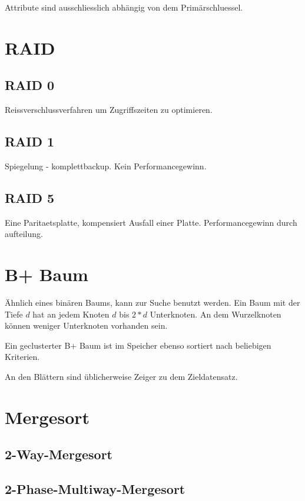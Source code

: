 \documentclass[10pt,a4paper,oneside]{report}
\begin{document}
Attribute sind ausschliesslich abhängig von dem Primärschluessel.

\section*{RAID}

\subsection*{RAID 0}

Reissverschlussverfahren um Zugriffszeiten zu optimieren.

\subsection*{RAID 1}

Spiegelung - komplettbackup. Kein Performancegewinn.

\subsection*{RAID 5}

Eine Paritaetsplatte, kompensiert Ausfall einer Platte. Performancegewinn durch aufteilung.

\section*{B+ Baum}

Ähnlich eines binären Baums, kann zur Suche benutzt werden. Ein Baum mit der Tiefe $d$ hat an jedem Knoten $d$ bis $2*d$ Unterknoten. An dem Wurzelknoten können weniger Unterknoten vorhanden sein.

Ein geclusterter B+ Baum ist im Speicher ebenso sortiert nach beliebigen Kriterien.

An den Blättern sind üblicherweise Zeiger zu dem Zieldatensatz.

\section*{Mergesort}

\subsection*{2-Way-Mergesort}

\subsection*{2-Phase-Multiway-Mergesort}
\end{document}
